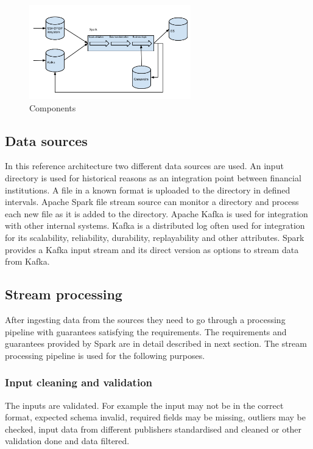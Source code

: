 \documentclass[a4paper, 10 pt, conference]{IEEEtran}
\begin{document}
\begin{figure}[hb]
	\begin{center}
		\caption{Components}
		\label{fig:components}
		\includegraphics[width=7cm,keepaspectratio]{architecture-diagram.png}
	\end{center}
\end{figure}

\subsection{Data sources}
In this reference architecture two different data sources are used. An input directory is used for historical reasons as an integration point between financial institutions. A file in a known format is uploaded to the directory in defined intervals. Apache Spark file stream source can monitor a directory and process each new file as it is added to the directory.
Apache Kafka is used for integration with other internal systems. Kafka is a distributed log often used for integration for its scalability, reliability, durability, replayability and other attributes. Spark provides a Kafka input stream and its direct version as options to stream data from Kafka.

\subsection{Stream processing}
After ingesting data from the sources they need to go through a processing pipeline with guarantees satisfying the requirements. The requirements and guarantees provided by Spark are in detail described in next section.
The stream processing pipeline is used for the following purposes.

\subsubsection{Input cleaning and validation}
The inputs are validated. For example the input may not be in the correct format, expected schema invalid, required fields may be missing, outliers may be checked, input data from different publishers standardised and cleaned or other validation done and data filtered.
\end{document}
